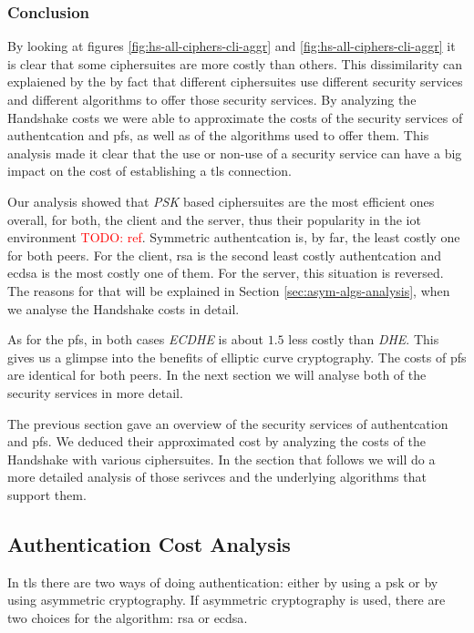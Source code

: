 \documentclass{llncs}
\newcommand{\todo}[1]{\textcolor{red}{TODO: #1}\PackageWarning{TODO:}{#1!}}
\begin{document}
\subsubsection{Conclusion}

By looking at figures \ref{fig:hs-all-ciphers-cli-aggr}
and \ref{fig:hs-all-ciphers-cli-aggr} it is clear that some ciphersuites are more costly than others. This dissimilarity
can explaiened by the by fact that different ciphersuites use different security services and different algorithms to 
offer those security services. By analyzing the Handshake costs we were able to approximate the costs of the security 
services of authentcation and \gls{pfs}, as well as of the algorithms used to offer them. This analysis made it clear that the 
use or non-use of a security service can have a big impact on the cost of establishing a \gls{tls} connection.

Our analysis showed that \textit{PSK} based ciphersuites are the most efficient ones overall, for both, the client
and the server, thus their popularity in the \gls{iot} environment \todo{ref}. Symmetric authentcation is, by far,
the least costly one for both peers. For the client, \gls{rsa} is the second least costly authentcation and \gls{ecdsa}
is the most costly one of them. For the server, this situation is reversed. The reasons for that will be explained in
Section \ref{sec:asym-algs-analysis}, when we analyse the Handshake costs in detail.

As for the \gls{pfs}, in both cases \textit{ECDHE} is about $1.5$ less costly than \textit{DHE}. This gives us a glimpse
into the benefits of elliptic curve cryptography. The costs of \gls{pfs} are identical for both peers. In the next
section we will analyse both of the security services in more detail.

The previous section gave an overview of the security services of authentcation and \gls{pfs}. We deduced their
approximated cost by analyzing the costs of the Handshake with various ciphersuites. In the section that follows
we will do a more detailed analysis of those serivces and the underlying algorithms that support them.

\subsection{Authentication Cost Analysis} \label{sec:auth-cost-analysis}

In \gls{tls} there are two ways of doing authentication: either by using a \gls{psk} or by using asymmetric cryptography.
If asymmetric cryptography is used, there are two choices for the algorithm: \gls{rsa} or \gls{ecdsa}.
\end{document}
